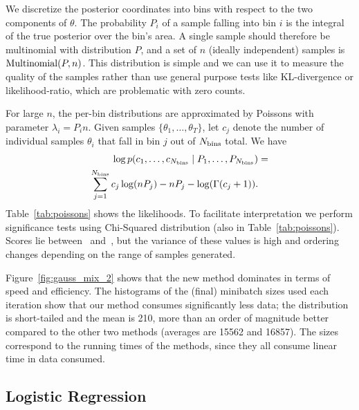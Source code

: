 \documentclass[twoside]{article} \usepackage{aistats2017}
\begin{document}
We discretize the posterior coordinates into bins with respect to the two
components of $\theta$.  The probability $P_i$ of a sample falling into bin $i$
is the integral of the true posterior over the bin's area.  A single sample
should therefore be multinomial with distribution $P$, and a set of $n$ (ideally
independent) samples is ${\rm Multinomial}(P,n)$. This distribution is simple
and we can use it to measure the quality of the samples rather than use general
purpose tests like KL-divergence or likelihood-ratio, which are problematic
with zero counts.

For large $n$, the per-bin distributions are approximated by Poissons with
parameter $\lambda_i=P_i n$. Given samples $\{\theta_1,\ldots,\theta_T\}$, let
$c_j$ denote the number of individual samples $\theta_i$ that fall in bin $j$
out of $N_{\rm bins}$ total. We have
\begin{equation}\label{eq:log_prob_poissons}
\begin{split}
    \log p(c_1, \ldots, c_{N_{\rm bins}} \mid P_1, \ldots, P_{N_{\rm bins}}) & =  \\
    \sum_{j=1}^{N_{\rm bins}} c_j \log (n P_j) - n P_j - \log(\Gamma(c_j+1)). & \\
\end{split}
\end{equation}
Table~\ref{tab:poissons} shows the likelihoods. To facilitate
interpretation we perform significance tests using Chi-Squared
distribution (also in Table~\ref{tab:poissons}). Scores lie
between~\citet{cutting_mh_2014} and~\citet{icml2014c1_bardenet14}, but
the variance of these values is high and ordering changes depending on
the range of samples generated.

Figure~\ref{fig:gauss_mix_2} shows that the new method dominates in
terms of speed and efficiency. The histograms of the (final) minibatch sizes
used each iteration show that our method consumes significantly less data; the
distribution is short-tailed and the mean is 210, more than an order of
magnitude better compared to the other two methods (averages are 15562 and
16857). The sizes correspond to the running times of the methods, since
they all consume linear time in data consumed. 


\subsection{Logistic Regression}\label{ssec:logistic}

\begin{table}[t]
    \caption{Gaussian Mixture Model Statistics}
    \label{tab:poissons}
    \centering
\end{table}
\end{document}
